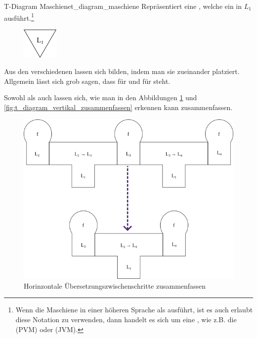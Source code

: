 \begin{Definition}{T-Diagram Maschiene}{t_diagram_maschiene}
  Repräsentiert eine , welche ein  in  $L_1$ ausführt.\footnote{Wenn die Maschiene  in einer höheren Sprache als  ausführt, ist es auch erlaubt diese Notation zu verwenden, dann handelt es sich um eine , wie z.B. die  (PVM) oder  (JVM).}
  \begin{figure}[H]
    \centering
    \includegraphics[height=1.5cm]{./figures/machiene.png}
  \end{figure}
\end{Definition}

Aus den verschiedenen  lassen sich  bilden, indem man sie  zueinander platziert. Allgemein lässt sich grob sagen, dass  für  und   für  steht.

Sowohl  als auch  lassen sich, wie man in den Abbildungen \ref{fig:t_diagram_horinzontal_zusammenfassen} und \ref{fig:t_diagram_vertikal_zusammenfassen} erkennen kann zusammenfassen.

\begin{figure}[H]
  \centering
  \includegraphics[width=0.66\linewidth]{./figures/summarize_compiler.png}
  \caption{Horinzontale Übersetzungszwischenschritte zusammenfassen}
  \label{fig:t_diagram_horinzontal_zusammenfassen}
\end{figure}

